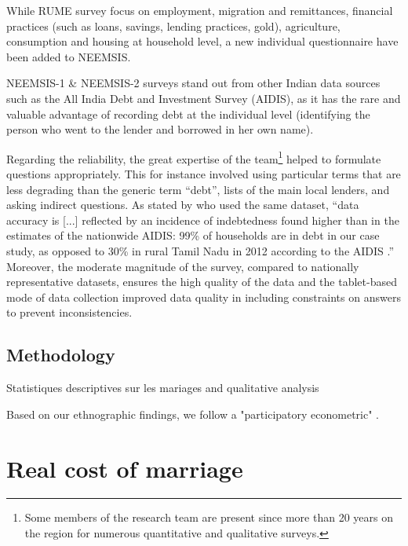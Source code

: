 \documentclass[a4paper, 11pt, onecolumn]{article}
\begin{document}
While RUME survey focus on employment, migration and remittances, financial practices (such as loans, savings, lending practices, gold), agriculture, consumption and housing at household level, a new individual questionnaire have been added to NEEMSIS.


NEEMSIS-1 \& NEEMSIS-2 surveys stand out from other Indian data sources such as the All India Debt and Investment Survey (AIDIS), as it has the rare and valuable advantage of recording debt at the individual level (identifying the person who went to the lender and borrowed in her own name).

Regarding the reliability, the great expertise of the team\footnote{Some members of the research team are present since more than 20 years on the region for numerous quantitative and qualitative surveys.} helped to formulate questions appropriately.
This for instance involved using particular terms that are less degrading than the generic term ``debt'', lists of the main local lenders, and asking indirect questions.
As stated by \cite{Reboul2021} who used the same dataset, ``data accuracy is [...] reflected by an incidence of indebtedness found higher than in the estimates of the nationwide AIDIS: 99\% of households are in debt in our case study, as opposed to 30\% in rural Tamil Nadu in 2012 according to the AIDIS \citep{NSSO2014}.'' 
Moreover, the moderate magnitude of the survey, compared to nationally representative datasets, ensures the high quality of the data and the tablet-based mode of data collection improved data quality in including constraints on answers to prevent inconsistencies. 



	
	
	
	\subsection{Methodology}

Statistiques descriptives sur les mariages and qualitative analysis


Based on our ethnographic findings, we follow a "participatory econometric" \cite{Rao1997, Rao2002}.







\section{Real cost of marriage}
\end{document}
